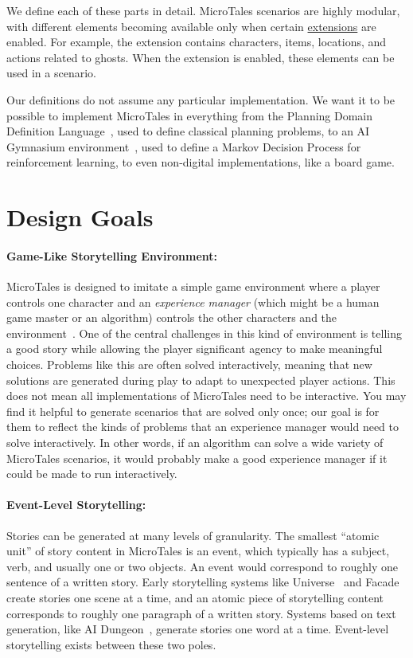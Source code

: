 \documentclass{nilreport}
\begin{document}
\noindent We define each of these parts in detail. MicroTales scenarios are highly modular, with different elements becoming available only when certain \hyperref[sec:extensions]{extensions} are enabled. For example, the  extension contains characters, items, locations, and actions related to ghosts. When the  extension is enabled, these elements can be used in a scenario.

Our definitions do not assume any particular implementation. We want it to be possible to implement MicroTales in everything from the Planning Domain Definition Language~\cite{ghallab1998pddl}, used to define classical planning problems, to an AI Gymnasium environment~\cite{towers2024gymnasium}, used to define a Markov Decision Process for reinforcement learning, to even non-digital implementations, like a board game.

\section{Design Goals}

\paragraph{Game-Like Storytelling Environment:} MicroTales is designed to imitate a simple game environment where a player controls one character and an {\em experience manager} (which might be a human game master or an algorithm) controls the other characters and the environment~\cite{riedl2013interactive}. One of the central challenges in this kind of environment is telling a good story while allowing the player significant agency to make meaningful choices. Problems like this are often solved interactively, meaning that new solutions are generated during play to adapt to unexpected player actions. This does not mean all implementations of MicroTales need to be interactive. You may find it helpful to generate scenarios that are solved only once; our goal is for them to reflect the kinds of problems that an experience manager would need to solve interactively. In other words, if an algorithm can solve a wide variety of MicroTales scenarios, it would probably make a good experience manager if it could be made to run interactively.

\paragraph{Event-Level Storytelling:} Stories can be generated at many levels of granularity. The smallest ``atomic unit'' of story content in MicroTales is an event, which typically has a subject, verb, and usually one or two objects. An event would correspond to roughly one sentence of a written story. Early storytelling systems like Universe~\cite{lebowitz1985story} and Facade~\cite{mateas2005structuring} create stories one scene at a time, and an atomic piece of storytelling content corresponds to roughly one paragraph of a written story. Systems based on text generation, like AI Dungeon~\cite{walton2019aidungeon}, generate stories one word at a time. Event-level storytelling exists between these two poles.
\end{document}
